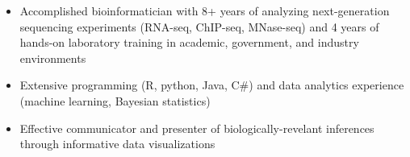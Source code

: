 

\begin{resentries}

\vspace{-2mm}

\begin{itemize}[leftmargin=*]
	\setlength{\itemsep}{-1.5mm}
	\item{Accomplished bioinformatician with 8+ years of analyzing next-generation sequencing experiments (RNA-seq, ChIP-seq, MNase-seq) and 4 years of hands-on laboratory training in academic, government, and industry environments}
	\item{Extensive programming (R, python, Java, C\#) and data analytics experience (machine learning, Bayesian statistics)}
	\item{Effective communicator and presenter of biologically-revelant inferences through informative data visualizations}

\end{itemize}

\end{resentries}
